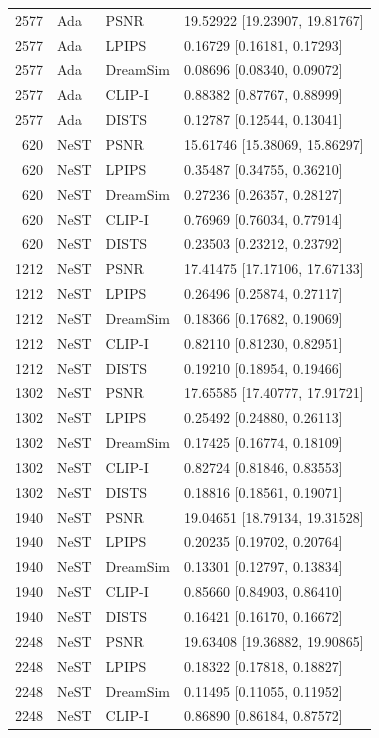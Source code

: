 \documentclass[10pt,letterpaper]{article}
\begin{document}
\begin{longtable}{@{}rlll@{}}
2577 & Ada & PSNR & 19.52922 [19.23907, 19.81767]\\
2577 & Ada & LPIPS & 0.16729 [0.16181, 0.17293]\\
2577 & Ada & DreamSim & 0.08696 [0.08340, 0.09072]\\
2577 & Ada & CLIP-I & 0.88382 [0.87767, 0.88999]\\
2577 & Ada & DISTS & 0.12787 [0.12544, 0.13041]\\
620 & NeST & PSNR & 15.61746 [15.38069, 15.86297]\\
620 & NeST & LPIPS & 0.35487 [0.34755, 0.36210]\\
620 & NeST & DreamSim & 0.27236 [0.26357, 0.28127]\\
620 & NeST & CLIP-I & 0.76969 [0.76034, 0.77914]\\
620 & NeST & DISTS & 0.23503 [0.23212, 0.23792]\\
1212 & NeST & PSNR & 17.41475 [17.17106, 17.67133]\\
1212 & NeST & LPIPS & 0.26496 [0.25874, 0.27117]\\
1212 & NeST & DreamSim & 0.18366 [0.17682, 0.19069]\\
1212 & NeST & CLIP-I & 0.82110 [0.81230, 0.82951]\\
1212 & NeST & DISTS & 0.19210 [0.18954, 0.19466]\\
1302 & NeST & PSNR & 17.65585 [17.40777, 17.91721]\\
1302 & NeST & LPIPS & 0.25492 [0.24880, 0.26113]\\
1302 & NeST & DreamSim & 0.17425 [0.16774, 0.18109]\\
1302 & NeST & CLIP-I & 0.82724 [0.81846, 0.83553]\\
1302 & NeST & DISTS & 0.18816 [0.18561, 0.19071]\\
1940 & NeST & PSNR & 19.04651 [18.79134, 19.31528]\\
1940 & NeST & LPIPS & 0.20235 [0.19702, 0.20764]\\
1940 & NeST & DreamSim & 0.13301 [0.12797, 0.13834]\\
1940 & NeST & CLIP-I & 0.85660 [0.84903, 0.86410]\\
1940 & NeST & DISTS & 0.16421 [0.16170, 0.16672]\\
2248 & NeST & PSNR & 19.63408 [19.36882, 19.90865]\\
2248 & NeST & LPIPS & 0.18322 [0.17818, 0.18827]\\
2248 & NeST & DreamSim & 0.11495 [0.11055, 0.11952]\\
2248 & NeST & CLIP-I & 0.86890 [0.86184, 0.87572]\\

\end{longtable}
\end{document}
